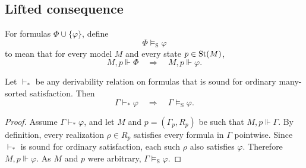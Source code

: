 \subsection{Lifted consequence}

\begin{definition}\label{def:state-semantic-consequence}
For formulas $\Phi\cup\{\varphi\}$, define
\[
\Phi\models_{\mathrm{S}}\varphi
\]
to mean that for every model $M$ and every state $p\in\mathrm{St}(M)$,
\[
M,p\Vdash\Phi
\quad\Longrightarrow\quad
M,p\Vdash\varphi.
\]
\end{definition}

\begin{proposition}\label{prop:lifted-pointwise-soundness}
Let $\vdash_*$ be any derivability relation on formulas that is sound for ordinary many-sorted satisfaction. Then
\[
\Gamma\vdash_*\varphi
\quad\Longrightarrow\quad
\Gamma\models_{\mathrm{S}}\varphi.
\]
\end{proposition}

\begin{proof}
Assume $\Gamma\vdash_*\varphi$, and let $M$ and $p=(\Gamma_p,R_p)$ be such that $M,p\Vdash\Gamma$. By definition, every realization $\rho\in R_p$ satisfies every formula in $\Gamma$ pointwise. Since $\vdash_*$ is sound for ordinary satisfaction, each such $\rho$ also satisfies $\varphi$. Therefore $M,p\Vdash\varphi$. As $M$ and $p$ were arbitrary, $\Gamma\models_{\mathrm{S}}\varphi$.
\end{proof}
